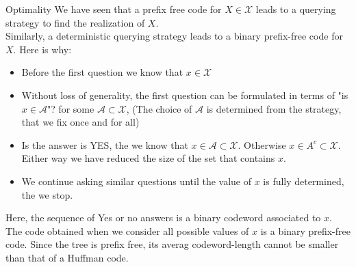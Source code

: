 \begin{parag}{Optimality}
    We have seen that a prefix free code for $X \in \mathcal{X}$ leads to a querying strategy to find the realization of $X$.
    \\
    Similarly, a deterministic querying strategy leads to a binary prefix-free code for $X$. Here is why:
    \begin{itemize}
        \item Before the first question we know that $x \in \mathcal{X}$
        \item Without loss of generality, the first question can be formulated in terms of "is $x \in \mathcal{A}$"? for some $ \mathcal{A} \subset \mathcal{X}$, (The choice of $ \mathcal{A}$ is determined from the strategy, that we fix once and for all)
        \item Is the answer is YES, the we know that $x \in \mathcal{A} \subset \mathcal{X}$. Otherwise $x \in A^c \subset \mathcal{X}$. Either way we have reduced the size of the set that contains $x$.
        \item We continue asking similar questions until the value of $x$ is fully determined, the we stop.
    \end{itemize}
    Here, the sequence of Yes or no answers is a binary codeword associated to $x$. The code obtained when we consider all possible values of $x$ is a binary prefix-free code. Since the tree is prefix free, its averag codeword-length cannot be smaller than that of a Huffman code.
\end{parag}


